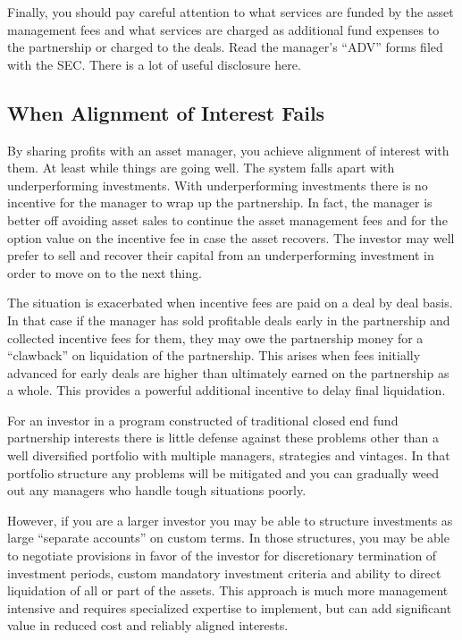 \documentclass[12pt,english]{article}\usepackage[]{graphicx}\usepackage[]{color}
\begin{document}
Finally, you should pay careful attention to what services are funded
by the asset management fees and what services are charged as additional
fund expenses to the partnership or charged to the deals. Read the
manager's ``ADV'' forms filed with the SEC. There is a lot of useful
disclosure here. 

\subsection*{When Alignment of Interest Fails}

By sharing profits with an asset manager, you achieve alignment of
interest with them. At least while things are going well. The system
falls apart with underperforming investments. With underperforming
investments there is no incentive for the manager to wrap up the partnership.
In fact, the manager is better off avoiding asset sales to continue
the asset management fees and for the option value on the incentive
fee in case the asset recovers. The investor may well prefer to sell
and recover their capital from an underperforming investment in order
to move on to the next thing.

The situation is exacerbated when incentive fees are paid on a deal
by deal basis. In that case if the manager has sold profitable deals
early in the partnership and collected incentive fees for them, they
may owe the partnership money for a ``clawback'' on liquidation
of the partnership. This arises when fees initially advanced for early
deals are higher than ultimately earned on the partnership as a whole.
This provides a powerful additional incentive to delay final liquidation.

For an investor in a program constructed of traditional closed end
fund partnership interests there is little defense against these problems
other than a well diversified portfolio with multiple managers, strategies
and vintages. In that portfolio structure any problems will be mitigated
and you can gradually weed out any managers who handle tough situations
poorly.

However, if you are a larger investor you may be able to structure
investments as large ``separate accounts'' on custom terms. In those
structures, you may be able to negotiate provisions in favor of the
investor for discretionary termination of investment periods, custom
mandatory investment criteria and ability to direct liquidation of
all or part of the assets. This approach is much more management intensive
and requires specialized expertise to implement, but can add significant
value in reduced cost and reliably aligned interests.
\end{document}
